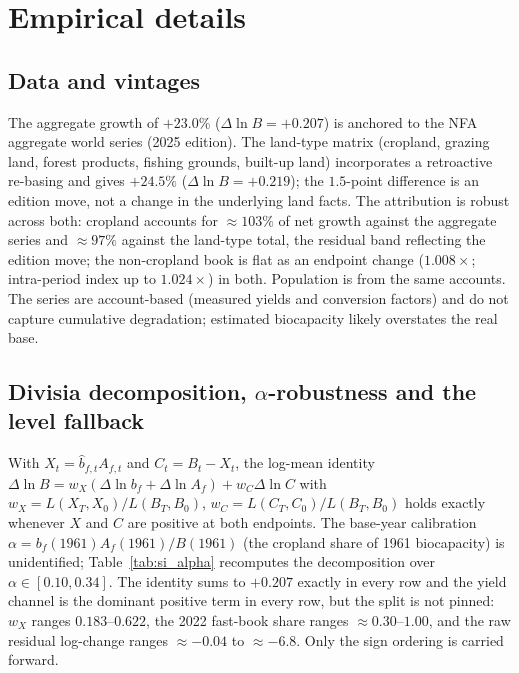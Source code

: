 \documentclass[11pt,a4paper]{article}
\begin{document}
\section{Empirical details}\label{si:empirical}

\subsection{Data and vintages}\label{si:vintages}

The aggregate growth of $+23.0\%$ ($\Delta\ln B=+0.207$) is anchored to the NFA aggregate world series (2025 edition). The land-type matrix (cropland, grazing land, forest products, fishing grounds, built-up land) incorporates a retroactive re-basing and gives $+24.5\%$ ($\Delta\ln B=+0.219$); the $1.5$-point difference is an edition move, not a change in the underlying land facts. The attribution is robust across both: cropland accounts for $\approx103\%$ of net growth against the aggregate series and $\approx97\%$ against the land-type total, the residual band reflecting the edition move; the non-cropland book is flat as an endpoint change ($1.008\times$; intra-period index up to $1.024\times$) in both. Population is from the same accounts. The series are account-based (measured yields and conversion factors) and do not capture cumulative degradation; estimated biocapacity likely overstates the real base.

\subsection{Divisia decomposition, $\alpha$-robustness and the level fallback}\label{si:divisia}

With $X_t=\hat b_{f,t}A_{f,t}$ and $C_t=B_t-X_t$, the log-mean identity $\Delta\ln B=w_X(\Delta\ln b_f+\Delta\ln A_f)+w_C\Delta\ln C$ with $w_X=L(X_T,X_0)/L(B_T,B_0)$, $w_C=L(C_T,C_0)/L(B_T,B_0)$ holds exactly whenever $X$ and $C$ are positive at both endpoints. The base-year calibration $\alpha=b_f(1961)A_f(1961)/B(1961)$ (the cropland share of 1961 biocapacity) is unidentified; Table~\ref{tab:si_alpha} recomputes the decomposition over $\alpha\in[0.10,0.34]$. The identity sums to $+0.207$ exactly in every row and the yield channel is the dominant positive term in every row, but the split is not pinned: $w_X$ ranges $0.183$--$0.622$, the 2022 fast-book share ranges $\approx0.30$--$1.00$, and the raw residual log-change ranges $\approx-0.04$ to $\approx-6.8$. Only the sign ordering is carried forward.
\end{document}
